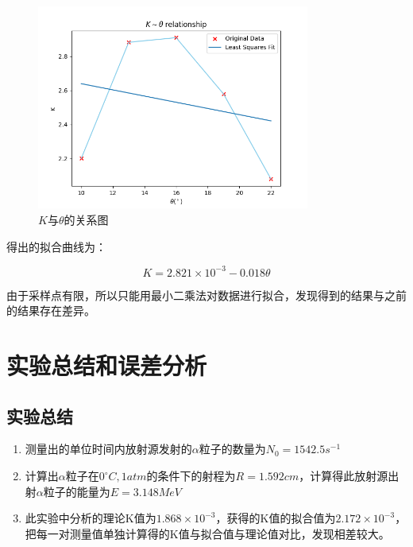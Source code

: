 \documentclass[a4paper,UTF8]{ctexart}
\begin{document}
\begin{figure}[H]
    \centering
    \begin{minipage}[b]{0.9\textwidth}
        \centering
        \includegraphics[width=0.8\textwidth]{./k.png}
        \caption{$K$与$\theta$的关系图}
    \end{minipage}
\end{figure}

得出的拟合曲线为：

\begin{equation}
    K = 2.821 \times 10^{-3} - 0.018 \theta
\end{equation}

由于采样点有限，所以只能用最小二乘法对数据进行拟合，发现得到的结果与之前的结果存在差异。

\section{实验总结和误差分析}

\subsection{实验总结}

\begin{enumerate}
    \item 测量出的单位时间内放射源发射的$\alpha$粒子的数量为$N_0 = 1542.5 s^{-1}$
    \item 计算出$\alpha$粒子在$0^\circ C,1 atm$的条件下的射程为$R = 1.592 cm$，计算得此放射源出射$\alpha$粒子的能量为$E = 3.148 MeV$
    \item 此实验中分析的理论K值为$1.868 \times 10^{-3}$，获得的K值的拟合值为$2.172 \times 10^{-3}$，把每一对测量值单独计算得的K值与拟合值与理论值对比，发现相差较大。
\end{enumerate}
\end{document}
